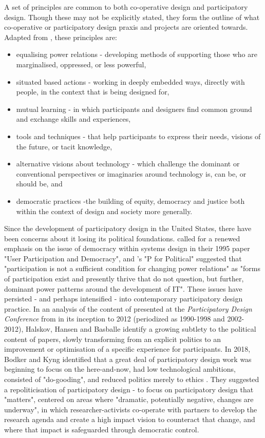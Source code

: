 A set of principles are common to both co-operative design and participatory design. Though these may not be explicitly stated, they form the outline of what co-operative or participatory design praxis and projects are oriented towards. Adapted from \citep{greenbaum_participation_2012}, these principles are:
\begin{itemize}
\item equalising power relations - developing methods of supporting those who are marginalised, oppressed, or less powerful,
\item situated based actions - working in deeply embedded ways, directly with people, in the context that is being designed for,
\item mutual learning - in which participants and designers find common ground and exchange skills and experiences,
\item tools and techniques - that help participants to express their needs, visions of the future, or tacit knowledge,
\item alternative visions about technology - which challenge the dominant or conventional perspectives or imaginaries around technology is, can be, or should be, and
\item democratic practices -the building of equity, democracy and justice both within the context of design and society more generally.
\end{itemize}

Since the development of participatory design in the United States, there have been concerns about it losing its political foundations. \citet{bjerknes_user_1995} called for a renewed emphasis on the issue of democracy within systems design in their 1995 paper "User Participation and Democracy", and \citet{beck_p_2002}'s "P for Political" suggested that "participation is not a sufficient condition for changing power relations" as "forms of participation exist and presently thrive that do not question, but further, dominant power patterns around the development of IT". These issues have persisted - and perhaps intensified - into contemporary participatory design practice. In an analysis of the content of presented at the \textit{Participatory Design Conference} from in its inception to 2012 (periodized as 1990-1998 and 2002-2012)\citep{halskov_diversity_2015, basballe_early_2016}, Halskov, Hansen and Basballe identify a growing subtlety to the political content of papers, slowly transforming from an explicit politics to an improvement or optimisation of a specific experience for participants. In 2018, Bodker and Kyng identified that a great deal of participatory design work was beginning to focus on the here-and-now, had low technological ambitions, consisted of "do-gooding", and reduced politics merely to ethics \citep{bodker_participatory_2018}. They suggested a repoliticisation of participatory design - to focus on participatory design that "matters", centered on areas where "dramatic, potentially negative, changes are underway", in which researcher-activists co-operate with partners to develop the research agenda and create a high impact vision to counteract that change, and where that impact is safeguarded through democratic control. 

